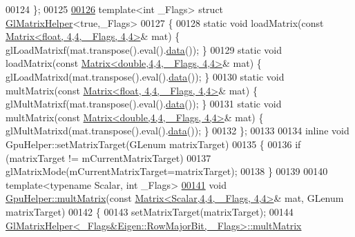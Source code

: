 \begin{DoxyCode}
00124 \};
00125 
\hyperlink{struct_gl_matrix_helper_3_01true_00_01___flags_01_4}{00126} \textcolor{keyword}{template}<\textcolor{keywordtype}{int} \_Flags> \textcolor{keyword}{struct }\hyperlink{struct_gl_matrix_helper}{GlMatrixHelper}<true,\_Flags>
00127 \{
00128     \textcolor{keyword}{static} \textcolor{keywordtype}{void} loadMatrix(\textcolor{keyword}{const} \hyperlink{group___core___module_class_eigen_1_1_matrix}{Matrix<float, 4,4, \_Flags, 4,4>}&  mat) \{ 
      glLoadMatrixf(mat.transpose().eval().\hyperlink{class_eigen_1_1_plain_object_base_ac25699535374b1854cf8494e44ad31b2}{data}()); \}
00129     \textcolor{keyword}{static} \textcolor{keywordtype}{void} loadMatrix(\textcolor{keyword}{const} \hyperlink{group___core___module_class_eigen_1_1_matrix}{Matrix<double,4,4, \_Flags, 4,4>}& mat) \{ 
      glLoadMatrixd(mat.transpose().eval().\hyperlink{class_eigen_1_1_plain_object_base_ac25699535374b1854cf8494e44ad31b2}{data}()); \}
00130     \textcolor{keyword}{static} \textcolor{keywordtype}{void} multMatrix(\textcolor{keyword}{const} \hyperlink{group___core___module_class_eigen_1_1_matrix}{Matrix<float, 4,4, \_Flags, 4,4>}&  mat) \{ 
      glMultMatrixf(mat.transpose().eval().\hyperlink{class_eigen_1_1_plain_object_base_ac25699535374b1854cf8494e44ad31b2}{data}()); \}
00131     \textcolor{keyword}{static} \textcolor{keywordtype}{void} multMatrix(\textcolor{keyword}{const} \hyperlink{group___core___module_class_eigen_1_1_matrix}{Matrix<double,4,4, \_Flags, 4,4>}& mat) \{ 
      glMultMatrixd(mat.transpose().eval().\hyperlink{class_eigen_1_1_plain_object_base_ac25699535374b1854cf8494e44ad31b2}{data}()); \}
00132 \};
00133 
00134 \textcolor{keyword}{inline} \textcolor{keywordtype}{void} GpuHelper::setMatrixTarget(GLenum matrixTarget)
00135 \{
00136     \textcolor{keywordflow}{if} (matrixTarget != mCurrentMatrixTarget)
00137         glMatrixMode(mCurrentMatrixTarget=matrixTarget);
00138 \}
00139 
00140 \textcolor{keyword}{template}<\textcolor{keyword}{typename} Scalar, \textcolor{keywordtype}{int} \_Flags>
\hyperlink{class_gpu_helper_a3abb45392e7dcf6450fa94bd345d9096}{00141} \textcolor{keywordtype}{void} \hyperlink{class_gpu_helper_a3abb45392e7dcf6450fa94bd345d9096}{GpuHelper::multMatrix}(\textcolor{keyword}{const} 
      \hyperlink{group___core___module_class_eigen_1_1_matrix}{Matrix<Scalar,4,4, \_Flags, 4,4>}& mat, GLenum matrixTarget)
00142 \{
00143     setMatrixTarget(matrixTarget);
00144     \hyperlink{struct_gl_matrix_helper}{GlMatrixHelper<\_Flags&Eigen::RowMajorBit, \_Flags>::multMatrix}

\end{DoxyCode}
